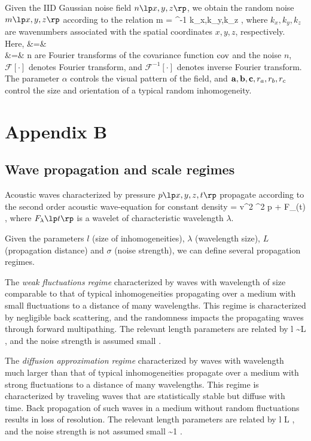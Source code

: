 Given the IID Gaussian noise field $n\ofxyz$, we obtain the random
noise $m\ofxyz$ according to the relation
%
\beq
m \ofxyz =
^{-1}
\lb {} \;
           \lp k_x,k_y,k_z \rp 
\rb\;,
\eeq
%
where $k_x,k_y,k_z$ are wavenumbers associated with the spatial
coordinates $x,y,z$, respectively. Here,
%
\bea
\widehat{\cov} &=&  \lb \cov \rb
\\
    &=&  \lb n \rb
\eea
%
are Fourier transforms of the covariance function $\mathrm{cov}$ and the noise
$n$, $\mathscr{F}[\cdot]$ denotes Fourier transform, and
$\mathscr{F}^{-1}[\cdot]$ denotes inverse Fourier transform. The
parameter $\alpha$ controls the visual pattern of the field, and
${\bf a},{\bf b},{\bf c}, r_a,r_b,r_c$ control the size and orientation of a
typical random inhomogeneity.

\appendix
\section{Appendix B}
\subsection{Wave propagation and scale regimes}

Acoustic waves characterized by pressure $p \lp x,y,z,t \rp$
propagate according to the second order acoustic wave-equation 
for constant density
%
\beq
{} = v^2 \nabla^2 p + F_{\lambda}(t) \;,
\eeq
%
where $F_{\lambda}\lp t \rp$ is a wavelet of characteristic wavelength
$\lambda$.

Given the parameters $l$ (size of inhomogeneities), $\lambda$
(wavelength size), $L$ (propagation distance) and $\sigma$ (noise
strength), we can define several propagation regimes.

The {\it weak fluctuations regime} characterized by waves with
wavelength of size comparable to that of typical inhomogeneities
propagating over a medium with small fluctuations to a distance of
many wavelengths. This regime is characterized by negligible back
scattering, and the randomness impacts the propagating waves through
forward multipathing. The relevant length parameters are related by
%
\beq
l \sim \lambda \ll L \;,
\eeq
%
and the noise strength is assumed small
%
\beq
\sigma {} \;.
\eeq

The {\it diffusion approximation regime} characterized by waves with
wavelength much larger than that of typical inhomogeneities propagate
over a medium with strong fluctuations to a distance of many
wavelengths. This regime is characterized by traveling waves that are
statistically stable but diffuse with time. Back propagation of such
waves in a medium without random fluctuations results in loss of
resolution. The relevant length parameters are related by
%
\beq
l \ll \lambda \ll L \;,
\eeq
%
and the noise strength is not assumed small
%
\beq
\sigma \sim 1 \;.
\eeq

